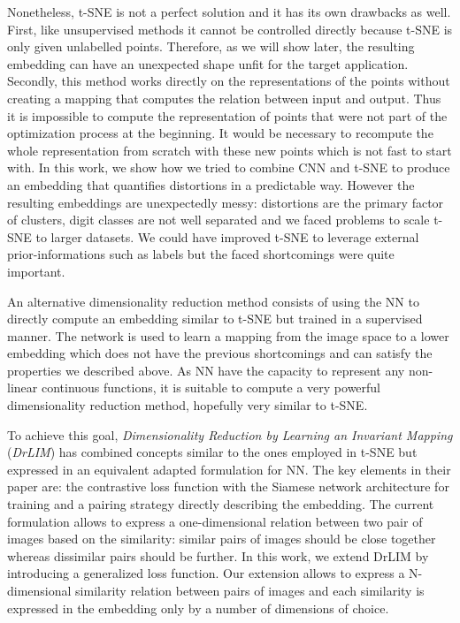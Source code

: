 \documentclass[a4paper,12pt]{report}
\begin{document}
Nonetheless, t-SNE is not a perfect solution and it has its own drawbacks as well.
First, like unsupervised methods it cannot be controlled directly because t-SNE is only given unlabelled points.
Therefore, as we will show later, the resulting embedding can have an unexpected shape unfit for the target application.
Secondly, this method works directly on the representations of the points without creating a mapping that computes the relation between input and output.
Thus it is impossible to compute the representation of points that were not part of the optimization process at the beginning.
It would be necessary to recompute the whole representation from scratch with these new points which is not fast to start with.
In this work, we show how we tried to combine CNN and t-SNE to produce an embedding that quantifies distortions in a predictable way.
However the resulting embeddings are unexpectedly messy: distortions are the primary factor of clusters, digit classes are not well separated and we faced problems to scale t-SNE to larger datasets.
We could have improved t-SNE to leverage external prior-informations such as labels but the faced shortcomings were quite important.

An alternative dimensionality reduction method consists of using the NN to directly compute an embedding similar to t-SNE but trained in a supervised manner.
The network is used to learn a mapping from the image space to a lower embedding which does not have the previous shortcomings and can satisfy the properties we described above.
As NN have the capacity to represent any non-linear continuous functions\cite{csaji2001approximation}, it is suitable to compute a very powerful dimensionality reduction method, hopefully very similar to t-SNE.

To achieve this goal, {\em Dimensionality Reduction by Learning an Invariant Mapping} ({\em DrLIM}) has combined concepts similar to the ones employed in t-SNE but expressed in an equivalent adapted formulation for NN.
The key elements in their paper are: the contrastive loss function with the Siamese network architecture for training and a pairing strategy directly describing the embedding.
The current formulation allows to express a one-dimensional relation between two pair of images based on the similarity: similar pairs of images should be close together whereas dissimilar pairs should be further.
In this work, we extend DrLIM by introducing a generalized loss function.
Our extension allows to express a N-dimensional similarity relation between pairs of images and each similarity is expressed in the embedding only by a number of dimensions of choice.
\end{document}
